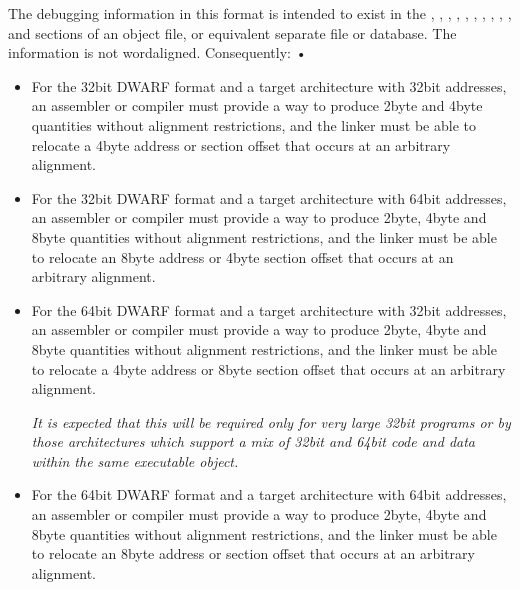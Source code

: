 The debugging information in this format is intended to
exist 
in 
the , 
, 
,
, 
, 
, 
,
, 
, 
, 
and 
sections of an object file, or equivalent
separate file or database. The information is not 
word\dash aligned. Consequently: •

\begin{itemize}
\item For the 32\dash bit DWARF format and a target architecture with
32\dash bit addresses, an assembler or compiler must provide a way
to produce 2\dash byte and 4\dash byte quantities without alignment
restrictions, and the linker must be able to relocate a
4\dash byte address or 
section offset that occurs at an arbitrary
alignment.

\item For the 32\dash bit DWARF format and a target architecture with
64\dash bit addresses, an assembler or compiler must provide a
way to produce 2\dash byte, 4\dash byte and 8\dash byte quantities without
alignment restrictions, and the linker must be able to relocate
an 8\dash byte address or 4\dash byte 
section offset that occurs at an
arbitrary alignment.

\item For the 64\dash bit DWARF format and a target architecture with
32\dash bit addresses, an assembler or compiler must provide a
way to produce 2\dash byte, 4\dash byte and 8\dash byte quantities without
alignment restrictions, and the linker must be able to relocate
a 4\dash byte address or 8\dash byte 
section offset that occurs at an
arbitrary alignment.

\textit{It is expected that this will be required only for very large
32\dash bit programs or by those architectures which support
a mix of 32\dash bit and 64\dash bit code and data within the same
executable object.}

\item For the 64\dash bit DWARF format and a target architecture with
64\dash bit addresses, an assembler or compiler must provide a
way to produce 2\dash byte, 4\dash byte and 8\dash byte quantities without
alignment restrictions, and the linker must be able to
relocate an 8\dash byte address or 
section offset that occurs at
an arbitrary alignment.
\end{itemize}

